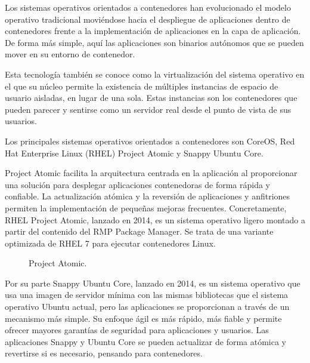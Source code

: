 Los sistemas operativos orientados a contenedores han evolucionado el modelo operativo tradicional moviéndose hacia el despliegue de aplicaciones dentro de contenedores frente a la implementación de aplicaciones en la capa de aplicación. De forma más simple, aquí las aplicaciones son binarios autónomos que se pueden mover en su entorno de contenedor.

Esta tecnología también se conoce como la virtualización del sistema operativo en el que su núcleo permite la existencia de múltiples instancias de espacio de usuario aisladas, en lugar de una sola. Estas instancias son los contenedores que pueden parecer y sentirse como un servidor real desde el punto de vista de sus usuarios.

Los principales sistemas operativos orientados a contenedores son CoreOS, Red Hat Enterprise Linux (RHEL) Project Atomic y Snappy Ubuntu Core.

Project Atomic facilita la arquitectura centrada en la aplicación al proporcionar una solución para desplegar aplicaciones contenedoras de forma rápida y confiable. La actualización atómica y la reversión de aplicaciones y anfitriones permiten la implementación de pequeñas mejoras frecuentes. Concretamente, RHEL Project Atomic, lanzado en 2014, es un sistema operativo ligero montado a partir del contenido del RMP Package Manager. Se trata de una variante optimizada de RHEL 7 para ejecutar contenedores Linux.

\begin{figure}[H]
\caption{Project Atomic.\label{fig:figure_placement_example}}
\end{figure}

Por su parte Snappy Ubuntu Core, lanzado en 2014, es un sistema operativo que usa una imagen de servidor mínima con las mismas bibliotecas que el sistema operativo Ubuntu actual, pero las aplicaciones se proporcionan a través de un mecanismo más simple. Su enfoque ágil es más rápido, más fiable y permite ofrecer mayores garantías de seguridad para aplicaciones y usuarios. Las aplicaciones Snappy y Ubuntu Core se pueden actualizar de forma atómica y revertirse si es necesario, pensando para contenedores.

